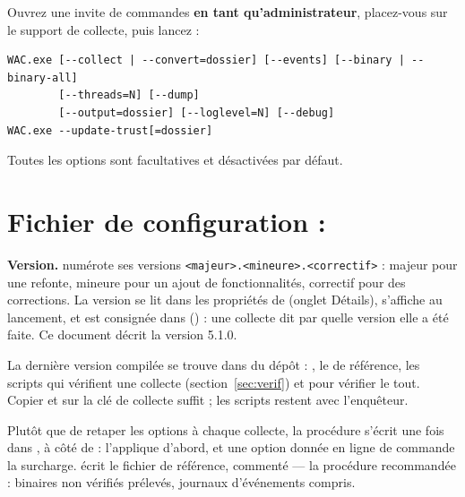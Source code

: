 \documentclass[11pt,a4paper,oneside]{report}
\begin{document}
Ouvrez une invite de commandes \textbf{en tant qu'administrateur}, placez-vous
sur le support de collecte, puis lancez :

\begin{lstlisting}
WAC.exe [--collect | --convert=dossier] [--events] [--binary | --binary-all]
        [--threads=N] [--dump]
        [--output=dossier] [--loglevel=N] [--debug]
WAC.exe --update-trust[=dossier]
\end{lstlisting}

Toutes les options sont facultatives et désactivées par défaut.

\section{Fichier de configuration : }

\textbf{Version.} \wac{} numérote ses versions \texttt{<majeur>.<mineure>.<correctif>} :
majeur pour une refonte, mineure pour un ajout de fonctionnalités, correctif
pour des corrections. La version se lit dans les propriétés de
 (onglet Détails), s'affiche au lancement, et est consignée
dans  () : une collecte dit par
quelle version elle a été faite. Ce document décrit la version 5.1.0.

La dernière version compilée se trouve dans  du dépôt :
, le  de référence, les scripts qui
vérifient une collecte (section~\ref{sec:verif}) et 
pour vérifier le tout. Copier  et  sur la
clé de collecte suffit ; les scripts restent avec l'enquêteur.

Plutôt que de retaper les options à chaque collecte, la procédure s'écrit une
fois dans , à côté de  : \wac{} l'applique
d'abord, et une option donnée en ligne de commande la surcharge.
 écrit le fichier de référence, commenté — la procédure
recommandée : binaires non vérifiés prélevés, journaux d'événements compris.
\end{document}

